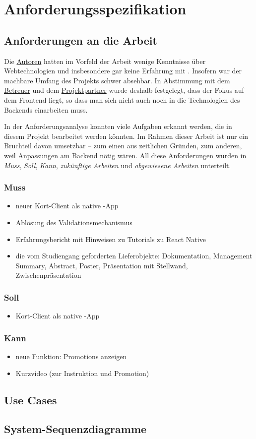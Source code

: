 \chapter{Anforderungsspezifikation}
\label{pd-anforderungsspezifikation}

\section{Anforderungen an die Arbeit} 
Die \hyperref[pm-rollen]{Autoren} hatten im Vorfeld der Arbeit wenige Kenntnisse über Webtechnologien und insbesondere gar keine Erfahrung mit .
Insofern war der machbare Umfang des Projekts schwer absehbar.
In Abstimmung mit dem \hyperref[pm-rollen]{Betreuer} und dem \hyperref[pm-rollen]{Projektpartner} wurde deshalb festgelegt, dass der Fokus auf dem Frontend liegt, so dass man sich nicht auch noch in die Technologien des Backends einarbeiten muss.

In der Anforderungsanalyse konnten viele Aufgaben erkannt werden, die in diesem Projekt bearbeitet werden könnten. Im Rahmen dieser Arbeit ist nur ein Bruchteil davon umsetzbar – zum einen aus zeitlichen Gründen, zum anderen, weil Anpassungen am Backend nötig wären.
All diese Anforderungen wurden in \emph{Muss}, \emph{Soll}, \emph{Kann}, \emph{zukünftige Arbeiten} und \emph{abgewiesene Arbeiten} unterteilt.

\subsection{Muss}
\begin{itemize}
	\item neuer Kort-Client als native -App
	\item Ablösung des Validationsmechanismus
	\item Erfahrungsbericht mit Hinweisen zu Tutorials zu React Native
	\item die vom Studiengang geforderten Lieferobjekte: Dokumentation, Management Summary, Abstract, Poster, Präsentation mit Stellwand, Zwischenpräsentation
\end{itemize}

\subsection{Soll}
\begin{itemize}
	\item Kort-Client als native -App
\end{itemize}

\subsection{Kann}
\begin{itemize}
	\item neue Funktion: Promotions anzeigen
	\item Kurzvideo (zur Instruktion und Promotion)
\end{itemize}


\section{Use Cases}


\section{System-Sequenzdiagramme}


